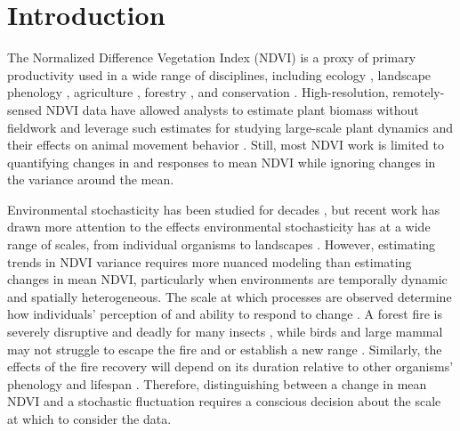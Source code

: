 \documentclass{article}
\begin{document}
\section{Introduction}

The Normalized Difference Vegetation Index (NDVI) is a proxy of primary productivity used in a wide range of disciplines, including ecology \citep{pettorelli_using_2005, pettorelli_normalized_2011}, landscape phenology \citep{merkle_large_2016, hmimina_evaluation_2013}, agriculture \citep{franch_30_2017}, forestry \citep{joao_indicator-based_2018}, and conservation \citep{mallegowda_assessing_2015, marcus_planning_2025}. High-resolution, remotely-sensed NDVI data have allowed analysts to estimate plant biomass without fieldwork \citep{bhatti_field_2024, borowik_normalized_2013} and leverage such estimates for studying large-scale plant dynamics \citep{pettorelli_using_2005} and their effects on animal movement behavior \citep{merkle_large_2016, aikens_greenscape_2017}. Still, most NDVI work is limited to quantifying changes in and responses to mean NDVI while ignoring changes in the variance around the mean.

Environmental stochasticity has been studied for decades \citep{levins_evolution_1974, stephens_optimal_1982, lande_risks_1993, saether_environmental_1997}, but recent work has drawn more attention to the effects environmental stochasticity has at a wide range of scales, from individual organisms \citep{mezzini_how_2025, rizzuto_forage_2021} to landscapes \citep{zhang_ndvi_2009, mutti_ndvi_2020, marcus_planning_2025}. However, estimating trends in NDVI variance requires more nuanced modeling than estimating changes in mean NDVI, particularly when environments are temporally dynamic and spatially heterogeneous. The scale at which processes are observed determine how individuals' perception of and ability to respond to change \citep{levin_problem_1992}. A forest fire is severely disruptive and deadly for many insects \citep{fettig_fire_2022}, while birds and large mammal may not struggle to escape the fire and or establish a new range \citep{franklin_relative_2021, calhoun_movement_2024}. Similarly, the effects of the fire recovery will depend on its duration relative to other organisms' phenology and lifespan \citep{frankham_importance_2004}. Therefore, distinguishing between a change in mean NDVI and a stochastic fluctuation requires a conscious decision about the scale at which to consider the data.
\end{document}
